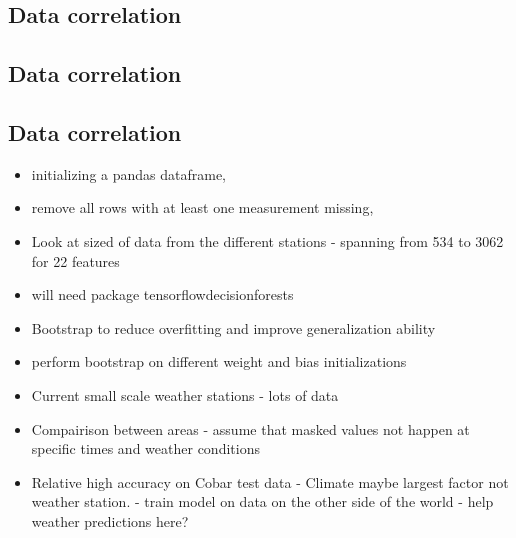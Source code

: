 \documentclass[11pt]{article}
\begin{document}
\subsection{Data correlation} %
\label{sub:Data correlation}

\subsection{Data correlation} %
\label{sub:Data correlation}

\subsection{Data correlation} %
\label{sub:Data correlation}

\begin{itemize}
    \item initializing a pandas dataframe,
    \item remove all rows with at least one measurement missing,
    \item Look at sized of data from the different stations - spanning from 534 to 3062 for 22 features
    \item will need package tensorflowdecisionforests
    \item Bootstrap to reduce overfitting and improve generalization ability
    \item perform bootstrap on different weight and bias initializations
    \item Current small scale weather stations - lots of data
    \item Compairison between areas - assume that masked values not happen at specific times and weather conditions
    \item Relative high accuracy on Cobar test data - Climate maybe largest factor not weather station.  - train model on data on the other side of the world - help weather predictions here?
\end{itemize}


\newpage
\appendix
\end{document}
